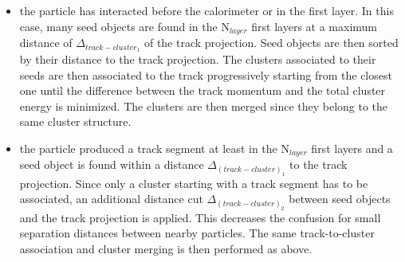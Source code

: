 \documentclass[12pt]{article}
\begin{document}
\begin{itemize}
  \item the particle has interacted before the calorimeter or in the first layer. In this case, many seed objects are found in the N$_{layer}$ first layers at a maximum distance of $\Delta_{{track-cluster}_1}$ of the track projection. Seed objects are then sorted by their distance to the track projection. The clusters associated to their seeds are then associated to the track progressively starting from the closest one until the difference between the track momentum and the total cluster energy is minimized. The clusters are then merged since they belong to the same cluster structure.
  \item the particle produced a track segment at least in the N$_{layer}$ first layers and a seed object is found within a distance $\Delta_{(track-cluster)_1}$ to the track projection. Since only a cluster starting with a track segment has to be associated, an additional distance cut $\Delta_{(track-cluster)_2}$ between seed objects and the track projection is applied. This decreases the confusion for small separation distances between nearby particles. The same track-to-cluster association and cluster merging is then performed as above.
\end{itemize}
\end{document}
